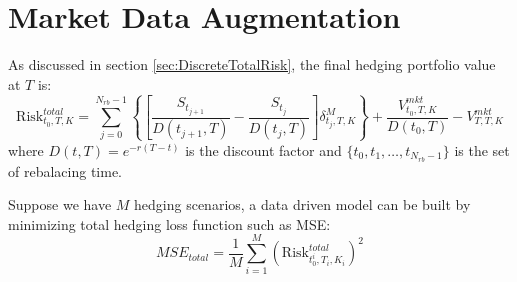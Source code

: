 \documentclass[letterpaper,12pt,titlepage,oneside,final]{book}
\numberwithin{equation}{section}
\theoremstyle{definition}
\newcommand{\Vmkt}{V^{mkt}}
\newcommand{\Smkt}{S}
\begin{document}
\section{Market Data Augmentation}
\label{sec:DataAugmentation}
As discussed in section \ref{sec:DiscreteTotalRisk}, the final hedging portfolio value at $T$ is:
\begin{equation}
   \text{Risk}^{total}_{t_0,T,K}=\sum_{j=0}^{N_{rb}-1}\left\{ \left[\frac{\Smkt_{t_{j+1}}}{D(t_{j+1},T)}-\frac{\Smkt_{t_{j}}}{D(t_{j},T)}\right] \delta^M_{t_j,T,K} \right\}+\frac{\Vmkt_{t_0,T,K}}{D(t_{0},T)}-\Vmkt_{T,T,K}
\end{equation}
where
$D(t,T)=e^{-r(T-t)}$ is the discount factor and $\{t_0,t_1, \dots, t_{N_{rb}-1}\}$ is the set of rebalacing time.

Suppose we have $M$ hedging scenarios, a data driven model can be built by minimizing total hedging loss function such as MSE:
\[
    MSE_{total}=\frac{1}{M}\sum_{i=1}^M  (\text{Risk}^{total}_{t^i_0,T_i,K_i})^2
\]
\end{document}

